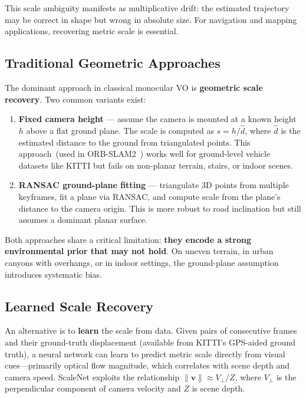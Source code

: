 \documentclass[12pt,a4paper]{article}
\begin{document}
This scale ambiguity manifests as multiplicative drift: the estimated trajectory may be correct in shape but wrong in absolute size. For navigation and mapping applications, recovering metric scale is essential.

\subsection{Traditional Geometric Approaches}

The dominant approach in classical monocular VO is \textbf{geometric scale recovery}. Two common variants exist:

\begin{enumerate}
    \item \textbf{Fixed camera height} --- assume the camera is mounted at a known height $h$ above a flat ground plane. The scale is computed as $s = h / \hat{d}$, where $\hat{d}$ is the estimated distance to the ground from triangulated points. This approach~(used in ORB-SLAM2~\cite{ORB-SLAM}) works well for ground-level vehicle datasets like KITTI but fails on non-planar terrain, stairs, or indoor scenes.
    \item \textbf{RANSAC ground-plane fitting} --- triangulate 3D points from multiple keyframes, fit a plane via RANSAC, and compute scale from the plane's distance to the camera origin. This is more robust to road inclination but still assumes a dominant planar surface.
\end{enumerate}

Both approaches share a critical limitation: \textbf{they encode a strong environmental prior that may not hold}. On uneven terrain, in urban canyons with overhangs, or in indoor settings, the ground-plane assumption introduces systematic bias.

\subsection{Learned Scale Recovery}

An alternative is to \textbf{learn} the scale from data. Given pairs of consecutive frames and their ground-truth displacement (available from KITTI's GPS-aided ground truth), a neural network can learn to predict metric scale directly from visual cues---primarily optical flow magnitude, which correlates with scene depth and camera speed. ScaleNet exploits the relationship $\|\mathbf{v}\| \approx V_\perp / Z$, where $V_\perp$ is the perpendicular component of camera velocity and $Z$ is scene depth.
\end{document}
